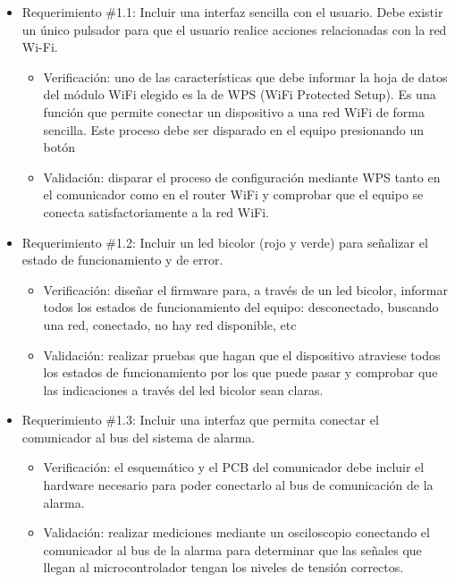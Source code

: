 \documentclass[
11pt, %
]{charter}
\begin{document}
\begin{itemize} 
	\item Requerimiento \#1.1: Incluir una interfaz sencilla con el usuario. Debe existir un único pulsador para que el usuario realice acciones relacionadas con la red Wi-Fi.
	\begin{itemize}
		\item Verificación: uno de las características que debe informar la hoja de datos del
módulo WiFi elegido es la de WPS (WiFi Protected Setup). Es una función que permite conectar un dispositivo a una red WiFi de forma sencilla. Este proceso debe ser disparado en el equipo presionando un botón
		\item Validación: disparar el proceso de configuración mediante WPS tanto en el
comunicador como en el router WiFi y comprobar que el equipo se conecta satisfactoriamente a la red WiFi.

	\end{itemize}
		
	\item Requerimiento \#1.2: Incluir un led bicolor (rojo y verde) para señalizar el estado de funcionamiento y de error.
	\begin{itemize}
		\item Verificación: diseñar el firmware para, a través de un led bicolor, informar todos los estados de funcionamiento del equipo: desconectado, buscando una red, conectado, no hay red disponible, etc
		\item Validación: realizar pruebas que hagan que el dispositivo atraviese todos los
estados de funcionamiento por los que puede pasar y comprobar que las indicaciones a través del led bicolor sean claras.
	\end{itemize}
			
	\item Requerimiento \#1.3: Incluir una interfaz que permita conectar el comunicador al bus del sistema de alarma.
	\begin{itemize}
		\item Verificación: el esquemático y el PCB del comunicador debe incluir el hardware necesario para poder conectarlo al bus de comunicación de la alarma. 
		\item Validación: realizar mediciones mediante un osciloscopio conectando el comunicador al bus de la alarma para determinar que las señales que llegan al microcontrolador tengan los niveles de tensión correctos.
	\end{itemize}
			

\end{itemize}
\end{document}
